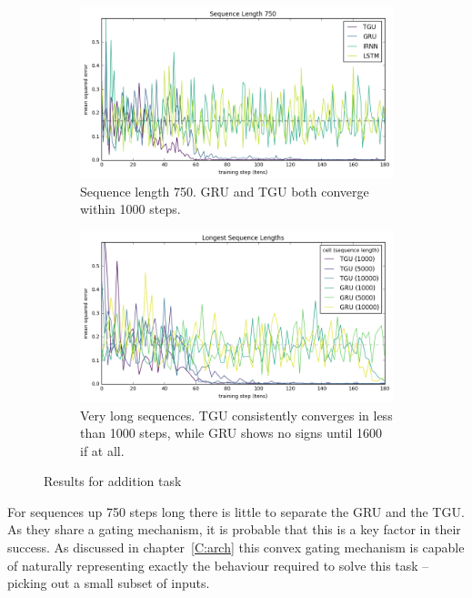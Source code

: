 \begin{figure}[ht]
\centering
\begin{subfigure}[t]{0.75\textwidth}
\includegraphics[width=\textwidth]{exps/addition/sl750}
\caption{Sequence length 750. GRU and TGU both converge within 1000 steps.}
\label{fig:add750}
\end{subfigure}

\begin{subfigure}[t]{0.75\textwidth}
\centering
\includegraphics[width=\textwidth]{exps/addition/long}
\caption{Very long sequences. TGU consistently converges in less than 1000 steps,
		 while GRU shows no signs until 1600 if at all.}
\label{fig:addlong}
\end{subfigure}

\caption{Results for addition task}
\label{fig:addresults}
\end{figure}

For sequences up 750 steps long there is little to separate the GRU and the TGU. As they share a gating
mechanism, it is probable that this is a key factor in their success. As discussed in
chapter~\ref{C:arch} this convex gating mechanism is capable of naturally representing exactly the
behaviour required to solve this task -- picking out a small subset of inputs.

